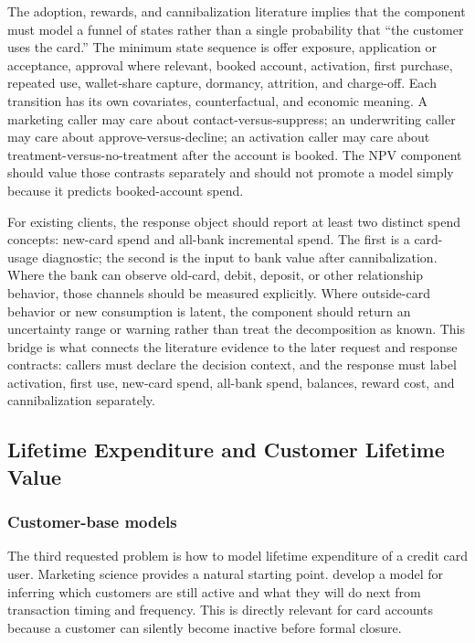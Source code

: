 \documentclass[11pt]{article}
\newcommand{\1}{\mathbf{1}}
\begin{document}
The adoption, rewards, and cannibalization literature implies that the
component must model a funnel of states rather than a single probability that
``the customer uses the card.'' The minimum state sequence is offer exposure,
application or acceptance, approval where relevant, booked account, activation,
first purchase, repeated use, wallet-share capture, dormancy, attrition, and
charge-off. Each transition has its own covariates, counterfactual, and
economic meaning. A marketing caller may care about contact-versus-suppress;
an underwriting caller may care about approve-versus-decline; an activation
caller may care about treatment-versus-no-treatment after the account is
booked. The NPV component should value those contrasts separately and should
not promote a model simply because it predicts booked-account spend.

For existing clients, the response object should report at least two distinct
spend concepts: new-card spend and all-bank incremental spend. The first is a
card-usage diagnostic; the second is the input to bank value after
cannibalization. Where the bank can observe old-card, debit, deposit, or other
relationship behavior, those channels should be measured explicitly. Where
outside-card behavior or new consumption is latent, the component should return
an uncertainty range or warning rather than treat the decomposition as known.
This bridge is what connects the literature evidence to the later request and
response contracts: callers must declare the decision context, and the response
must label activation, first use, new-card spend, all-bank spend, balances,
reward cost, and cannibalization separately.

\subsection{Lifetime Expenditure and Customer Lifetime Value}
\label{sec:ltv}

\subsubsection{Customer-base models}

The third requested problem is how to model lifetime expenditure of a credit
card user. Marketing science provides a natural starting point. \citet{schmittlein1987counting}
develop a model for inferring which customers are still active and what they
will do next from transaction timing and frequency. This is directly relevant
for card accounts because a customer can silently become inactive before formal
closure.
\end{document}
